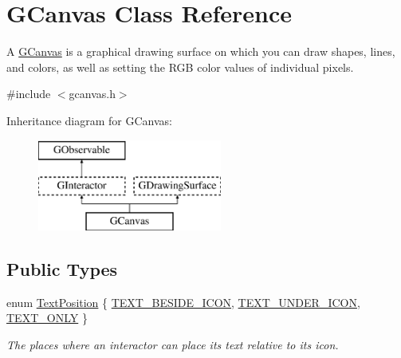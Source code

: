 \hypertarget{classGCanvas}{}\section{G\+Canvas Class Reference}
\label{classGCanvas}


A \mbox{\hyperlink{classGCanvas}{G\+Canvas}} is a graphical drawing surface on which you can draw shapes, lines, and colors, as well as setting the R\+GB color values of individual pixels.  




{\ttfamily \#include $<$gcanvas.\+h$>$}

Inheritance diagram for G\+Canvas\+:\begin{figure}[H]
\begin{center}
\leavevmode
\includegraphics[height=3.000000cm]{classGCanvas}
\end{center}
\end{figure}
\subsection*{Public Types}
\begin{DoxyCompactItemize}
\item 
enum \mbox{\hyperlink{classGInteractor_a8e0d441725a81d2bbdebbea09078260e}{Text\+Position}} \{ \mbox{\hyperlink{classGInteractor_a8e0d441725a81d2bbdebbea09078260ea4cd6f2e7d5a08d6f4dc052df2358f774}{T\+E\+X\+T\+\_\+\+B\+E\+S\+I\+D\+E\+\_\+\+I\+C\+ON}}, 
\mbox{\hyperlink{classGInteractor_a8e0d441725a81d2bbdebbea09078260eaa88490f63d8de68d44c83bdb2ecde3b3}{T\+E\+X\+T\+\_\+\+U\+N\+D\+E\+R\+\_\+\+I\+C\+ON}}, 
\mbox{\hyperlink{classGInteractor_a8e0d441725a81d2bbdebbea09078260ea39a6f388a30ac4fefb6eb13e846bc9f2}{T\+E\+X\+T\+\_\+\+O\+N\+LY}}
 \}
\begin{DoxyCompactList}\small\item\em The places where an interactor can place its text relative to its icon. \end{DoxyCompactList}\end{DoxyCompactItemize}
